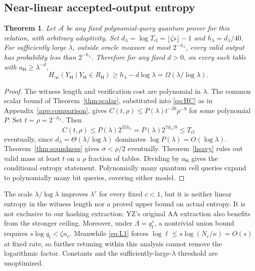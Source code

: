 \documentclass[11pt]{article}
\newtheorem{theorem}{Theorem}[section]
\theoremstyle{definition}\newtheorem{definition}[theorem]{Definition}
\theoremstyle{remark}\newtheorem{remark}[theorem]{Remark}
\newcommand{\mc}{\mathcal}\newcommand{\eps}{\varepsilon}
\begin{document}
\subsection{Near-linear accepted-output entropy}\label{sec:nearlinear}
\begin{theorem}\label{thm:nearlinear}
Let \(\mc A\) be any fixed polynomial-query quantum prover for this relation, with arbitrary adaptivity. Set \(d_\lambda=\log T_{\mathrm{cl}}=\lfloor\zeta s\rfloor-1\) and \(h_\lambda=d_\lambda/40\). For sufficiently large \(\lambda\), outside oracle measure at most \(2^{-h_\lambda}\), every valid output has probability less than \(2^{-h_\lambda}\). Therefore for any fixed \(d>0\), on every such table with \(a_{\mathsf H}\ge\lambda^{-d}\),
\[
 H_\infty(Y_{\mathsf H}\mid Y_{\mathsf H}\in R_{\mathsf H})\ge h_\lambda-d\log\lambda=\Omega(\lambda/\log\lambda).
\]
\end{theorem}
\begin{proof}
The witness length and verification cost are polynomial in \(\lambda\). The common scalar bound of Theorem~\ref{thm:scalar}, substituted into \eqref{eq:HC} as in Appendix~\ref{app:comparison}, gives \(C(t,\rho)\le P(\lambda)t^{-26}\rho^{-9}\) for some polynomial \(P\). Set \(t=\rho=2^{-h_\lambda}\). Then
\[
 C(t,\rho)\le P(\lambda)2^{35h_\lambda}=P(\lambda)2^{7d_\lambda/8}\le T_{\mathrm{cl}}
\]
eventually, since \(d_\lambda=\Theta(\lambda/\log\lambda)\) dominates \(\log P(\lambda)=O(\log\lambda)\). Theorem~\ref{thm:soundness} gives \(\sigma<\rho/2\) eventually. Theorem~\ref{heavy} rules out valid mass at least \(t\) on a \(\rho\) fraction of tables. Dividing by \(a_{\mathsf H}\) gives the conditional entropy statement. Polynomially many quantum cell queries expand to polynomially many bit queries, covering either model.
\end{proof}

The scale \(\lambda/\log\lambda\) improves \(\lambda^c\) for every fixed \(c<1\), but it is neither linear entropy in the witness length nor a proved upper bound on actual entropy. It is not exclusive to our hashing extraction: YZ's original AA extraction also benefits from the stronger ceiling. Moreover, under \(\Lambda=q_{\mathrm f}^s\), a nontrivial union bound requires \(s\log q_{\mathrm f}<\zeta n_{\mathrm c}\). Meanwhile \eqref{eq:L1} forces \(\log\ell\le s\log(N_{\mathrm c}/\kappa)=O(s)\) at fixed rate, so further retuning within this analysis cannot remove the logarithmic factor. Constants and the sufficiently-large-\(\lambda\) threshold are unoptimized.
\end{document}
